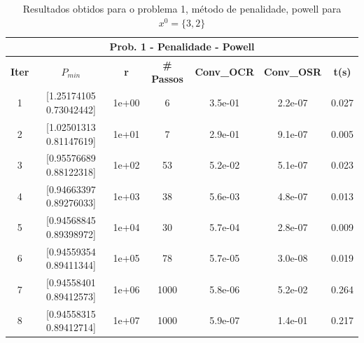 \documentclass[10pt, a4paper]{article}
\begin{document}
\vspace{5mm}
\begin{table}[H]
  \begin{center}
    \begin{tabular}{c|c|c|c|c|c|c}
      \multicolumn{7}{c}{\textbf{Prob. 1 - Penalidade - Powell}}\\
      \hline
      \textbf{Iter} & \textbf{$P_{min}$} & \textbf{r} & \textbf{\# Passos} & \textbf{Conv\_OCR} & \textbf{Conv\_OSR} & \textbf{t(s)}\\
      \hline
        1& [1.25174105 0.73042442]& 1e+00& 6& 3.5e-01& 2.2e-07& 0.027     \\
        2& [1.02501313 0.81147619]& 1e+01& 7& 2.9e-01& 9.1e-07& 0.005\\
        3& [0.95576689 0.88122318]& 1e+02& 53& 5.2e-02& 5.1e-07& 0.023\\
        4& [0.94663397 0.89276033]& 1e+03& 38& 5.6e-03& 4.8e-07& 0.013\\
        5& [0.94568845 0.89398972]& 1e+04& 30& 5.7e-04& 2.8e-07& 0.009\\
        6& [0.94559354 0.89411344]& 1e+05& 78& 5.7e-05& 3.0e-08& 0.019\\
        7& [0.94558401 0.89412573]& 1e+06& 1000& 5.8e-06& 5.2e-02& 0.264\\
        8& [0.94558315 0.89412714]& 1e+07& 1000& 5.9e-07& 1.4e-01& 0.217\\
    \end{tabular}
  \end{center}
  \caption{Resultados obtidos para o problema 1, método de penalidade, powell para $x^0=\{3,2\}$}
\end{table}
\end{document}
